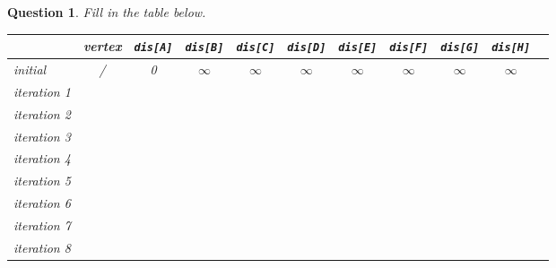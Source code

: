 \documentclass[10.5pt]{article}
\newtheorem{Q}{Question}
\begin{document}
	\begin{Q}
		Fill in the table below.
		\begin{table}[htbp]
			\begin{center}  
				\begin{tabular}{|l|c|c|c|c|c|c|c|c|c| p{3cm}|}  
					\hline  
					& vertex & \texttt{dis[A]} & \texttt{dis[B]} & \texttt{dis[C]} & \texttt{dis[D]} & \texttt{dis[E]} & \texttt{dis[F]} & \texttt{dis[G]} & \texttt{dis[H]}\\ \hline  
					initial 	& / & 0 &$\infty$&$\infty$&$\infty$&$\infty$&$\infty$&$\infty$&$\infty$\\ \hline
					iteration 1 &   &   &   &   &   &   &   &   &  \\ \hline    
					iteration 2 &   &   &   &   &   &   &   &   &  \\ \hline    
					iteration 3 &   &   &   &   &   &   &   &   &  \\ \hline    
					iteration 4 &   &   &   &   &   &   &   &   &  \\ \hline    
					iteration 5 &   &   &   &   &   &   &   &   &  \\ \hline   
					iteration 6 &   &   &   &   &   &   &   &   &  \\ \hline    
					iteration 7 &   &   &   &   &   &   &   &   &  \\ \hline   
					iteration 8 &   &   &   &   &   &   &   &   &  \\  
					\hline  
				\end{tabular}  
			\end{center}  
		\end{table}
	\end{Q}
\end{document}
